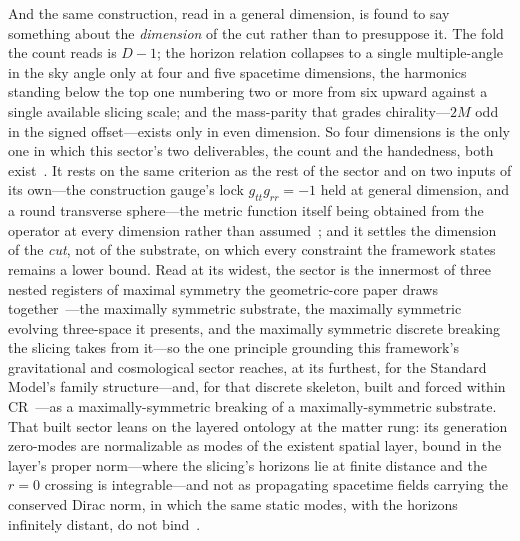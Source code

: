 \documentclass[11pt,a4paper]{article}
\theoremstyle{plain}
\theoremstyle{definition}
\theoremstyle{remark}
\begin{document}
\begin{enumerate}
And the same construction, read in a general dimension, is found to say something about the \emph{dimension} of the cut rather than to presuppose it. The fold the count reads is $D-1$; the horizon relation collapses to a single multiple-angle in the sky angle only at four and five spacetime dimensions, the harmonics standing below the top one numbering two or more from six upward against a single available slicing scale; and the mass-parity that grades chirality---$2M$ odd in the signed offset---exists only in even dimension. So four dimensions is the only one in which this sector's two deliverables, the count and the handedness, both exist~\cite{JanzenSlicing,JanzenMatter}. It rests on the same criterion as the rest of the sector and on two inputs of its own---the construction gauge's lock $g_{tt}g_{rr}=-1$ held at general dimension, and a round transverse sphere---the metric function itself being obtained from the operator at every dimension rather than assumed~\cite{JanzenSlicing}; and it settles the dimension of the \emph{cut}, not of the substrate, on which every constraint the framework states remains a lower bound. Read at its widest, the sector is the innermost of three nested registers of maximal symmetry the geometric-core paper draws together~\cite{JanzenGeometricCore}---the maximally symmetric substrate, the maximally symmetric evolving three-space it presents, and the maximally symmetric discrete breaking the slicing takes from it---so the one principle grounding this framework's gravitational and cosmological sector reaches, at its furthest, for the Standard Model's family structure---and, for that discrete skeleton, built and forced within CR~\cite{JanzenMatter}---as a maximally-symmetric breaking of a maximally-symmetric substrate. That built sector leans on the layered ontology at the matter rung: its generation zero-modes are normalizable as modes of the existent spatial layer, bound in the layer's proper norm---where the slicing's horizons lie at finite distance and the $r=0$ crossing is integrable---and not as propagating spacetime fields carrying the conserved Dirac norm, in which the same static modes, with the horizons infinitely distant, do not bind~\cite{JanzenMatter}.



\end{enumerate}
\end{document}
